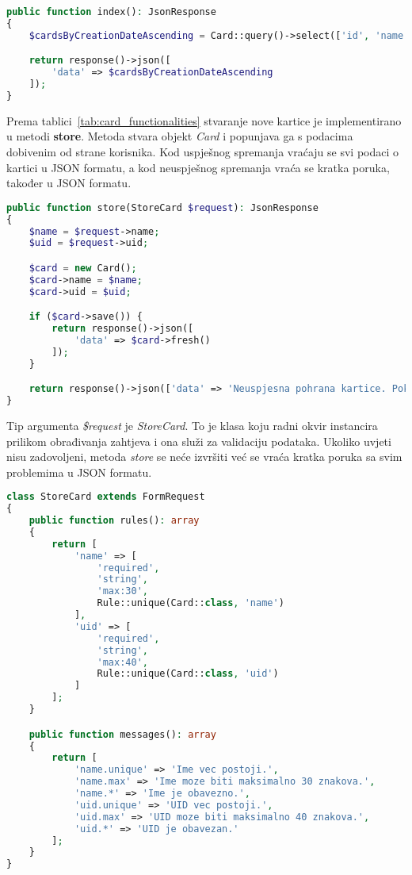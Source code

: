 \begin{lstlisting}[language=PHP]
public function index(): JsonResponse
{
    $cardsByCreationDateAscending = Card::query()->select(['id', 'name', 'uid'])->orderBy('created_at')->get();

    return response()->json([
        'data' => $cardsByCreationDateAscending
    ]);
}
\end{lstlisting}

Prema tablici~\ref{tab:card_functionalities} stvaranje nove kartice je implementirano u metodi \textbf{store}.
Metoda stvara objekt \textit{Card} i popunjava ga s podacima dobivenim od strane korisnika.
Kod uspješnog spremanja vraćaju se svi podaci o kartici u JSON formatu, a kod neuspješnog spremanja vraća se kratka poruka,
također u JSON formatu.

\begin{lstlisting}[language=PHP]
public function store(StoreCard $request): JsonResponse
{
    $name = $request->name;
    $uid = $request->uid;

    $card = new Card();
    $card->name = $name;
    $card->uid = $uid;

    if ($card->save()) {
        return response()->json([
            'data' => $card->fresh()
        ]);
    }

    return response()->json(['data' => 'Neuspjesna pohrana kartice. Pokusajte ponovo!']);
}
\end{lstlisting}

Tip argumenta \textit{\$request} je \textit{StoreCard}.
To je klasa koju radni okvir instancira prilikom obrađivanja zahtjeva i ona služi za validaciju podataka.
Ukoliko uvjeti nisu zadovoljeni, metoda \textit{store} se neće izvršiti već se vraća kratka poruka sa svim problemima u
JSON formatu.

\begin{lstlisting}[language=PHP]
class StoreCard extends FormRequest
{
    public function rules(): array
    {
        return [
            'name' => [
                'required',
                'string',
                'max:30',
                Rule::unique(Card::class, 'name')
            ],
            'uid' => [
                'required',
                'string',
                'max:40',
                Rule::unique(Card::class, 'uid')
            ]
        ];
    }

    public function messages(): array
    {
        return [
            'name.unique' => 'Ime vec postoji.',
            'name.max' => 'Ime moze biti maksimalno 30 znakova.',
            'name.*' => 'Ime je obavezno.',
            'uid.unique' => 'UID vec postoji.',
            'uid.max' => 'UID moze biti maksimalno 40 znakova.',
            'uid.*' => 'UID je obavezan.'
        ];
    }
}
\end{lstlisting}

